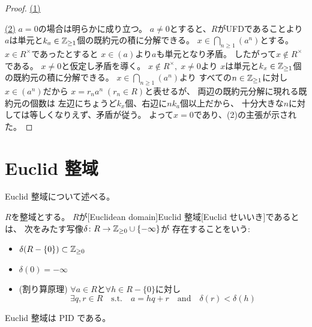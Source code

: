 \documentclass[report]{jlreq}
\begin{document}
\begin{proof}
    \uline{(1)} \quad
    \TODO{}

    \uline{(2)} \quad
    $a = 0$の場合は明らかに成り立つ。
    $a \neq 0$とすると、$R$がUFDであることより
    $a$は単元と$k_a \in \mathbb{Z}_{\ge 1}$個の既約元の積に分解できる。
    $x \in \bigcap_{n \ge 1} (a^n)$とする。
    $x \in R^\times$であったとすると
    $x \in (a)$より$a$も単元となり矛盾。
    したがって$x \notin R^\times$である。
    $x \neq 0$と仮定し矛盾を導く。
    $x \notin R^\times, \; x \neq 0$より
    $x$は単元と$k_x \in \mathbb{Z}_{\ge 1}$個の既約元の積に分解できる。
    $x \in \bigcap_{n \ge 1} (a^n)$より
    すべての$n \in \mathbb{Z}_{\ge 1}$に対し
    $x \in (a^n)$だから
    $x = r_n a^n \; (r_n \in R)$と表せるが、
    両辺の既約元分解に現れる既約元の個数は
    左辺にちょうど$k_x$個、右辺に$nk_a$個以上だから、
    十分大きな$n$に対しては等しくなりえず、矛盾が従う。
    よって$x = 0$であり、(2)の主張が示された。
\end{proof}

%
\section{Euclid 整域}

Euclid 整域について述べる。

\begin{definition}[Euclid 整域]
    $R$を整域とする。
    $R$が[Euclidean domain]{Euclid 整域}[Euclid せいいき]であるとは、
    次をみたす写像$\delta \colon R \to \mathbb{Z}_{\ge 0} \cup \{-\infty\}$が
    存在することをいう:
    \begin{itemize}
        \item $\delta(R - \{0\}) \subset \mathbb{Z}_{\ge 0}$
        \item $\delta(0) = -\infty$
        \item (割り算原理)
            $\forall a \in R$と$\forall h \in R - \{0\}$に対し
            \begin{equation}
                \exists q, r \in R \quad \text{s.t.} \quad
                a = hq + r \quad \text{and} \quad
                \delta(r) < \delta(h)
            \end{equation}
    \end{itemize}
\end{definition}

Euclid 整域は PID である。
\end{document}
